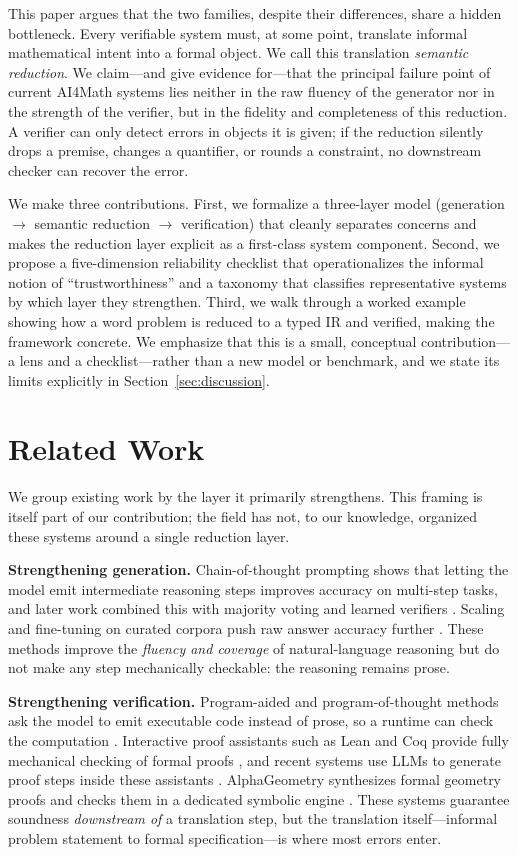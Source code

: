 \documentclass[11pt]{article}
\begin{document}
This paper argues that the two families, despite their differences, share a hidden bottleneck. Every verifiable system must, at some point, translate informal mathematical intent into a formal object. We call this translation \emph{semantic reduction}. We claim---and give evidence for---that the principal failure point of current AI4Math systems lies neither in the raw fluency of the generator nor in the strength of the verifier, but in the fidelity and completeness of this reduction. A verifier can only detect errors in objects it is given; if the reduction silently drops a premise, changes a quantifier, or rounds a constraint, no downstream checker can recover the error.

We make three contributions. First, we formalize a three-layer model (generation $\rightarrow$ semantic reduction $\rightarrow$ verification) that cleanly separates concerns and makes the reduction layer explicit as a first-class system component. Second, we propose a five-dimension reliability checklist that operationalizes the informal notion of ``trustworthiness'' and a taxonomy that classifies representative systems by which layer they strengthen. Third, we walk through a worked example showing how a word problem is reduced to a typed IR and verified, making the framework concrete. We emphasize that this is a small, conceptual contribution---a lens and a checklist---rather than a new model or benchmark, and we state its limits explicitly in Section~\ref{sec:discussion}.

\section{Related Work}
We group existing work by the layer it primarily strengthens. This framing is itself part of our contribution; the field has not, to our knowledge, organized these systems around a single reduction layer.

\textbf{Strengthening generation.} Chain-of-thought prompting \cite{wei2022cot} shows that letting the model emit intermediate reasoning steps improves accuracy on multi-step tasks, and later work combined this with majority voting and learned verifiers \cite{cobbe2021gsm8k}. Scaling and fine-tuning on curated corpora push raw answer accuracy further \cite{lewkowycz2022minerva}. These methods improve the \emph{fluency and coverage} of natural-language reasoning but do not make any step mechanically checkable: the reasoning remains prose.

\textbf{Strengthening verification.} Program-aided and program-of-thought methods ask the model to emit executable code instead of prose, so a runtime can check the computation \cite{gao2023pal,chen2022pot}. Interactive proof assistants such as Lean and Coq provide fully mechanical checking of formal proofs \cite{moura2015lean,coqmanual}, and recent systems use LLMs to generate proof steps inside these assistants \cite{yang2023leandojo}. AlphaGeometry synthesizes formal geometry proofs and checks them in a dedicated symbolic engine \cite{trinh2024alphageometry}. These systems guarantee soundness \emph{downstream of} a translation step, but the translation itself---informal problem statement to formal specification---is where most errors enter.
\end{document}
